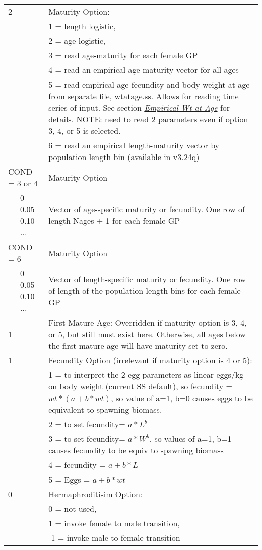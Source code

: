 \begin{center}
\begin{longtable}{p{0.5cm} p{2cm} p{12cm}}
	   2 & & Maturity Option: \\
	     & & 1 = length logistic,\\
	     & & 2 = age logistic,\\
	     & & 3 = read age-maturity for each female GP\\
	     & & 4 = read an empirical age-maturity vector for all ages\\
	     & & 5 = read empirical age-fecundity and body weight-at-age from separate file, wtatage.ss.  Allows for reading time series of input. See section \hyperlink{WAA}{\textit{Empirical Wt-at-Age}} for details. NOTE:  need to read 2 parameters even if option 3, 4, or 5 is selected.\\
	     & & 6 = read an empirical length-maturity vector by population length bin (available in v3.24q)\\
	   \hline

	   \multicolumn{2}{l}{COND = 3 or 4} & Maturity Option\\
	   & 0 0.05 0.10 ... & Vector of age-specific maturity or fecundity.  One row of length Nages + 1 for each female GP\\
	   \multicolumn{2}{l}{COND = 6} & Maturity Option\\
	   & 0 0.05 0.10 ... & Vector of length-specific maturity or fecundity.  One row of length of the population length bins for each female GP\\
	   \hline

	   1 & & First Mature Age: Overridden if maturity option is 3, 4, or 5, but still must exist here.  Otherwise, all ages below the first mature age will have maturity set to zero.\\
	   \hline

	   1 & & Fecundity Option (irrelevant if maturity option is 4 or 5):\\
	     & & 1 = to  interpret the 2 egg parameters as linear eggs/kg on body weight (current SS default),  so fecundity = $wt * (a+b*wt)$, so value of a=1, b=0 causes eggs to be equivalent to spawning biomass.\\
	     & & 2 = to set fecundity= $a*L^ b$\\
	     & & 3 = to set fecundity= $a*W^ b$, so values of a=1, b=1 causes fecundity to be equiv to spawning biomass\\
	     & & 4 = fecundity = $a+b*L$\\
	     & & 5 = Eggs = $a+b*wt$\\
	  \hline

	  0 & & Hermaphroditisim Option:\\
	   &  & 0 = not used, \\
	   &  & 1 = invoke female to male transition, \\
	   &  & -1 = invoke male to female transition \\
	  \hline


\end{longtable}
\end{center}
